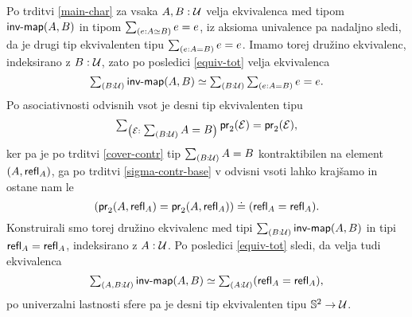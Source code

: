 \begin{dokaz}
  Po trditvi \ref{main-char} za vsaka \(A, B : \mathcal{U}\) velja ekvivalenca med tipom \(\textnormal{\textsf{inv-map}}(A, B)\) in tipom \(\textstyle \sum_{\left( e : A \simeq B \right)} e = e\), iz aksioma univalence pa nadaljno sledi, da je drugi tip ekvivalenten tipu \(\textstyle \sum_{\left( e : A = B \right)} e = e\). Imamo torej družino ekvivalenc, indeksirano z \(B : \mathcal{U}\), zato po posledici \ref{equiv-tot} velja ekvivalenca
  \[\textstyle \sum_{\left( B : \mathcal{U} \right)} \textnormal{\textsf{inv-map}}(A, B) \simeq \textstyle \sum_{\left( B : \mathcal{U} \right)} \textstyle \sum_{\left( e : A = B \right)} e = e.\]
  Po asociativnosti odvisnih vsot je desni tip ekvivalenten tipu
  \[\textstyle \sum_{\left( \mathcal{E} : \textstyle \sum_{\left( B : \mathcal{U} \right)} A = B \right)} \textnormal{\textsf{pr}}_{2}(\mathcal{E}) = \textnormal{\textsf{pr}}_{2}(\mathcal{E}),\]
  ker pa je po trditvi \ref{cover-contr} tip \(\textstyle \sum_{\left( B : \mathcal{U} \right)} A = B\) kontraktibilen na element \((A, \textnormal{\textsf{refl}}_{A})\), ga po trditvi \ref{sigma-contr-base} v odvisni vsoti lahko krajšamo in ostane nam le
  \[(\textnormal{\textsf{pr}}_{2}(A, \textnormal{\textsf{refl}}_{A}) = \textnormal{\textsf{pr}}_{2}(A, \textnormal{\textsf{refl}}_{A})) \doteq (\textnormal{\textsf{refl}}_{A} = \textnormal{\textsf{refl}}_{A}).\]
  Konstruirali smo torej družino ekvivalenc med tipi \(\textstyle \sum_{\left( B : \mathcal{U} \right)} \textnormal{\textsf{inv-map}}(A, B)\)
  in tipi \(\textnormal{\textsf{refl}}_{A} = \textnormal{\textsf{refl}}_{A}\), indeksirano z \(A : \mathcal{U}\). Po posledici \ref{equiv-tot} sledi, da velja tudi ekvivalenca
  \[\textstyle \sum_{\left( A, B : \mathcal{U} \right)} \textnormal{\textsf{inv-map}}(A, B) \simeq \textstyle \sum_{\left( A : \mathcal{U} \right)} (\textnormal{\textsf{refl}}_{A} = \textnormal{\textsf{refl}}_{A}),\]
  po univerzalni lastnosti sfere pa je desni tip ekvivalenten tipu \(\mathbb{S}^{2} \to \mathcal{U}\).
\end{dokaz}

